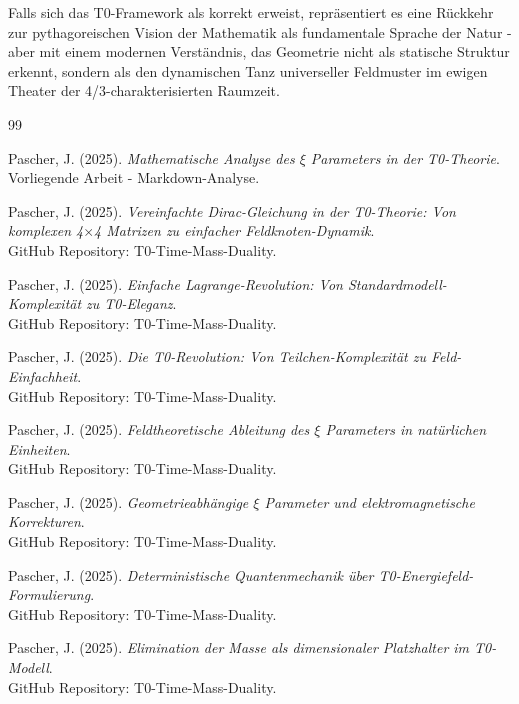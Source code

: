 	Falls sich das T0-Framework als korrekt erweist, repräsentiert es eine Rückkehr zur pythagoreischen Vision der Mathematik als fundamentale Sprache der Natur - aber mit einem modernen Verständnis, das Geometrie nicht als statische Struktur erkennt, sondern als den dynamischen Tanz universeller Feldmuster im ewigen Theater der 4/3-charakterisierten Raumzeit.
	
	\begin{thebibliography}{99}
		
		Pascher, J. (2025). \textit{Mathematische Analyse des $\xi$ Parameters in der T0-Theorie}. \\
		Vorliegende Arbeit - Markdown-Analyse.
		
		Pascher, J. (2025). \textit{Vereinfachte Dirac-Gleichung in der T0-Theorie: Von komplexen 4$\times$4 Matrizen zu einfacher Feldknoten-Dynamik}. \\
		GitHub Repository: T0-Time-Mass-Duality.
		
		Pascher, J. (2025). \textit{Einfache Lagrange-Revolution: Von Standardmodell-Komplexität zu T0-Eleganz}. \\
		GitHub Repository: T0-Time-Mass-Duality.
		
		Pascher, J. (2025). \textit{Die T0-Revolution: Von Teilchen-Komplexität zu Feld-Einfachheit}. \\
		GitHub Repository: T0-Time-Mass-Duality.
		
		Pascher, J. (2025). \textit{Feldtheoretische Ableitung des $\xi$ Parameters in natürlichen Einheiten}. \\
		GitHub Repository: T0-Time-Mass-Duality.
		
		Pascher, J. (2025). \textit{Geometrieabhängige $\xi$ Parameter und elektromagnetische Korrekturen}. \\
		GitHub Repository: T0-Time-Mass-Duality.
		
		Pascher, J. (2025). \textit{Deterministische Quantenmechanik über T0-Energiefeld-Formulierung}. \\
		GitHub Repository: T0-Time-Mass-Duality.
		
		Pascher, J. (2025). \textit{Elimination der Masse als dimensionaler Platzhalter im T0-Modell}. \\
		GitHub Repository: T0-Time-Mass-Duality.
		
	\end{thebibliography}
	